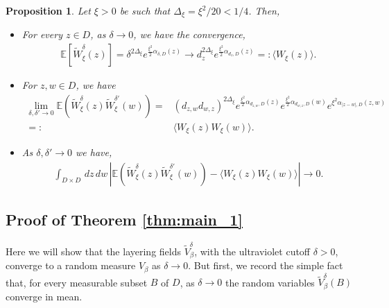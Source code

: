 \documentclass[a4paper, 11pt, reqno]{amsart}
\theoremstyle{definition} \newtheorem{defn}{Definition}[section]
\theoremstyle{remark} \newtheorem{rem}[defn]{Remark}
\theoremstyle{remark} \newtheorem*{rem*}{Remark}
\theoremstyle{plain} \newtheorem{thm}[defn]{Theorem}
\theoremstyle{plain} \newtheorem{lem}[defn]{Lemma}
\theoremstyle{plain} \newtheorem{prop}[defn]{Proposition}
\theoremstyle{plain} \newtheorem{cor}[defn]{Corollary}
\theoremstyle{remark} \newtheorem{exm}[defn]{\textbf{Example}}
\theoremstyle{remark} \newtheorem{exms}[defn]{\textbf{Examples}}
\theoremstyle{remark} \newtheorem*{bl}{}
\numberwithin{equation}{section} %
\newcommand{\x}{\times}
\newcommand{\E}{\mathbb{E}}
\begin{document}
	\begin{prop}\label{prop:GLF_facts}
		Let $\xi > 0$ be such that $\Delta_{\xi} = \xi^2/20 < 1/4$. Then, 
		\begin{itemize}
			\item[(i)] For every $z \in D$, as $\delta \to 0$, we have the convergence,
			\begin{align} \label{eq:W_1_pt_1}
				\E[\tilde{W}^{\delta}_{\xi}(z)] = \delta^{2\Delta_{\xi}} e^{\frac{\xi^2}{2} \alpha_{\delta, D} (z) }\to d_z^{2\Delta_{\xi} } e^{\frac{\xi^2}{2} \alpha_{d_z, D}(z) } = : \langle W_{\xi}(z)\rangle.
			\end{align}  

            \item[(ii)] For $z, w \in D$, %
            we have
            \begin{align}\label{eq:W_2_pt}
                \lim_{\delta, \delta' \to 0} \E (\tilde{W}^{\delta}_{\xi}(z) \tilde{W}^{\delta'}_{\xi}(w)) = &(d_{z,w}d_{w,z})^{2\Delta_{\xi}} e^{\frac{\xi^2}{2}  \alpha_{d_{z,w},D}(z) } e^{\frac{\xi^2}{2}  \alpha_{d_{w,z}, D}(w)} e^{\xi^2  \alpha_{|z-w|,D}(z,w)}
			\nonumber \\
			= :& \langle W_{\xi}(z) W_{\xi}(w)\rangle.
            \end{align}
            \item[(iii)] As $\delta, \delta' \to 0$ we have,
            \begin{align}\label{eq:L^1_conv_W_0}
                \int_{D\x D} \, dz \, dw \, |\E (\tilde{W}^{\delta}_{\xi}(z) \tilde{W}^{\delta'}_{\xi}(w)) - \langle W_{\xi}(z) W_{\xi}(w)\rangle | \to 0.
            \end{align}
          \end{itemize}		
    \end{prop}
	
	\subsection{Proof of Theorem \ref{thm:main_1}}\label{sec:PLF_exists}
	
	Here we will show that the layering fields $\tilde{V}^{\delta}_{\beta}$, with the ultraviolet cutoff $\delta>0$, converge to a random measure $V_{\beta}$ as $\delta \to 0$. But first, we record the simple fact that, for every measurable subset $B$ of $D$, as $\delta\to 0$ the random variables $\tilde{V}^{\delta}_{\beta}(B)$ converge in mean. 
	
\end{document}
